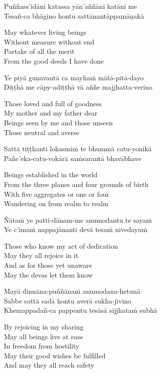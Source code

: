 Puññass’idāni katassa yān’aññāni katāni me\\
Tesañ-ca bhāgino hontu sattānantāppamāṇakā

\begin{cprenglish}
May whatever living beings\\
Without measure without end\\
Partake of all the merit\\
From the good deeds I have done
\end{cprenglish}

Ye piyā guṇavantā ca mayhaṁ mātā-pitā-dayo\\
Diṭṭhā me cāpy-adiṭṭhā vā aññe majjhatta-verino

\begin{cprenglish}
Those loved and full of goodness\\
My mother and my father dear\\
Beings seen by me and those unseen\\
Those neutral and averse
\end{cprenglish}

Sattā tiṭṭhanti lokasmiṁ te bhummā catu-yonikā\\
Pañc’eka-catu-vokārā saṁsarantā bhavābhave

\begin{cprenglish}
Beings established in the world\\
From the three planes and four grounds of birth\\
With five aggregates or one or four\\
Wandering on from realm to realm
\end{cprenglish}

Ñātaṁ ye patti-dānam-me anumodantu te sayaṁ\\
Ye c’imaṁ nappajānanti devā tesaṁ nivedayuṁ

\begin{cprenglish}
Those who know my act of dedication\\
May they all rejoice in it\\
And as for those yet unaware\\
May the devas let them know
\end{cprenglish}

Mayā dinnāna-puññānaṁ anumodana-hetunā\\
Sabbe sattā sadā hontu averā sukha-jīvino\\
Khemappadañ-ca pappontu tesāsā sijjhataṁ subhā

\begin{cprenglish}
By rejoicing in my sharing\\
May all beings live at ease\\
In freedom from hostility\\
May their good wishes be fulfilled\\
And may they all reach safety
\end{cprenglish}

